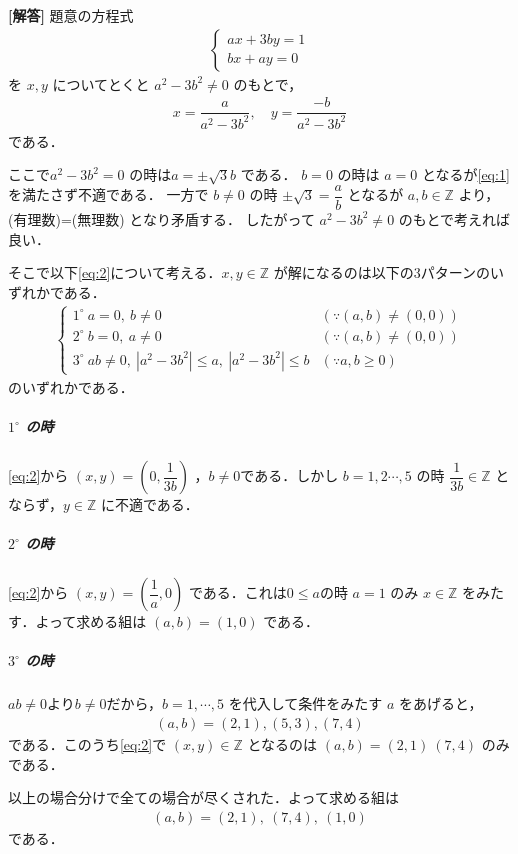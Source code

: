 \documentclass[../../main.tex]{subfiles}
\begin{document}
\begin{oframed}
  
\end{oframed}

{\bf [解答]}
題意の方程式
\begin{align}
  \begin{cases}
    ax+3by=1 \\
    bx+ay=0
  \end{cases} \label{eq:1}
\end{align}
を $x,y$ についてとくと $a^2-3b^2\ne0$ のもとで，
\begin{align}
  x=\dfrac{a}{a^2-3b^2}, \quad y=\dfrac{-b}{a^2-3b^2} \label{eq:2}
\end{align}
である．

ここで$a^2-3b^2=0$ の時は$a=\pm\sqrt{3} b$ である．
$b=0$ の時は $a=0$ となるが\cref{eq:1}を満たさず不適である．
一方で $b\ne0$ の時 $\pm\sqrt{3}=\dfrac{a}{b}$ となるが $a,b\in\mathbb{Z}$ より，(有理数)=(無理数) となり矛盾する．
したがって $a^2-3b^2\ne 0$ のもとで考えれば良い．

そこで以下\cref{eq:2}について考える．$x,y\in\mathbb{Z}$ が解になるのは以下の3パターンのいずれかである．
\begin{align}
  \begin{cases}
    1^\circ\ a=0,\ b\ne 0 & (\because(a,b)\ne(0,0)) \\
    2^\circ\ b=0,\ a\ne 0 & (\because(a,b)\ne(0,0)) \\
    3^\circ\ ab\ne 0,\ |a^2-3b^2|\le a,\ |a^2-3b^2|\le b & (\because a,b\ge 0)
  \end{cases}
\end{align}
のいずれかである．

\subparagraph{$1^\circ$ の時}

\cref{eq:2}から $(x,y)=\left(0,\dfrac{1}{3b}\right)$ ，$b\neq 0$である．しかし $b=1,2\cdots,5$ の時 $\dfrac{1}{3b}\in\mathbb{Z}$ とならず，$y\in\mathbb{Z}$ に不適である．

\subparagraph{$2^\circ$ の時}

\cref{eq:2}から $(x,y)=\left(\dfrac{1}{a},0\right)$ である．これは$0\le a$の時 $a=1$ のみ $x\in\mathbb{Z}$ をみたす．よって求める組は $(a,b)=(1,0)$ である．

\subparagraph{$3^\circ$ の時}

$ab \ne 0$より$b\neq 0$だから，$b=1,\cdots,5$ を代入して条件をみたす $a$ をあげると，
\begin{align}
  (a,b) = (2,1), (5,3), (7,4)
\end{align}
である．このうち\cref{eq:2}で $(x,y)\in\mathbb{Z}$ となるのは $(a,b)=(2,1)\ (7,4)$ のみである．
\casesend

以上の場合分けで全ての場合が尽くされた．よって求める組は
\begin{align}
  (a,b)=(2,1),\ (7,4),\ (1,0)
\end{align}
である．

\newpage
\end{document}
